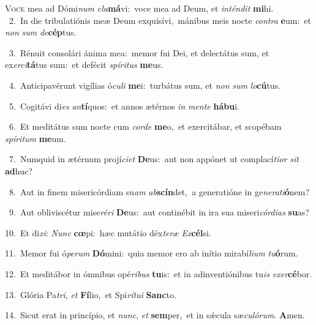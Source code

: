 \lettrine{\initial\textcolor{\initialcolor}{V}}{oce} mea ad Dómi\textit{num} \textit{cla}\-\textbf{má}vi:~\star voce mea ad Deum, et \textit{in}\-\textit{tén}\textit{dit} \textbf{mi}\-hi.\\
{\numbfont\textcolor{\numbcolor}{~2.}}~In die tribulatiónis meæ Deum exquisívi,~\dagger mánibus meis nocte \textit{con}\-\textit{tra} \textbf{e}\-um:~\star et \textit{non} \textit{sum} \textit{de}\-\textbf{cép}tus.\par
{\numbfont\textcolor{\numbcolor}{~3.}}~Rénuit consolári ánima mea:~\dagger memor fui Dei, et delectátus sum, et ex\-\textit{er}\-\textit{ci}\textbf{tá}tus sum:~\star et defécit \textit{spí}\-\textit{ri}\textit{tus} \textbf{me}\-us.\par
{\numbfont\textcolor{\numbcolor}{~4.}}~Anticipavérunt vigílias ó\-\textit{cu}\-\textit{li} \textbf{me}\-i:~\star turbátus sum, et \textit{non} \textit{sum} \textit{lo}\-\textbf{cú}tus.\par
{\numbfont\textcolor{\numbcolor}{~5.}}~Cogitávi di\textit{es} \textit{an}\-\textbf{tí}quos:~\star et annos ætérnos \textit{in} \textit{men}\-\textit{te} \textbf{há}\-\textbf{bu}i.\par
{\numbfont\textcolor{\numbcolor}{~6.}}~Et meditátus sum nocte cum \textit{cor}\-\textit{de} \textbf{me}\-o,~\star et exercitábar, et scopébam \textit{spí}\-\textit{ri}\textit{tum} \textbf{me}\-um.\par
{\numbfont\textcolor{\numbcolor}{~7.}}~Numquid in ætérnum projí\-\textit{ci}\-\textit{et} \textbf{De}\-us:~\star aut non appónet ut complací\-\textit{ti}\-\textit{or} \textit{sit} \textbf{ad}\-huc?\par
{\numbfont\textcolor{\numbcolor}{~8.}}~Aut in finem misericórdiam su\textit{am} \textit{ab}\-\textbf{scín}det,~\star a generatióne in ge\-\textit{ne}\-\textit{ra}\textit{ti}\textbf{ó}nem?\par
{\numbfont\textcolor{\numbcolor}{~9.}}~Aut obliviscétur mise\-\textit{ré}\-\textit{ri} \textbf{De}\-us:~\star aut continébit in ira sua miseri\-\textit{cór}\-\textit{di}\textit{as} \textbf{su}\-as?\par
{\numbfont\textcolor{\numbcolor}{10.}}~Et di\-\textit{xi}\-: \textit{Nunc} \textbf{cœ}\-pi:~\star hæc mutátio déx\-\textit{te}\-\textit{ræ} \textit{Ex}\-\textbf{cél}si.\par
{\numbfont\textcolor{\numbcolor}{11.}}~Memor fui ó\-\textit{pe}\-\textit{rum} \textbf{Dó}\-mini:~\star quia memor ero ab inítio mirabí\-\textit{li}\-\textit{um} \textit{tu}\-\textbf{ó}rum.\par
{\numbfont\textcolor{\numbcolor}{12.}}~Et meditábor in ómnibus opé\-\textit{ri}\-\textit{bus} \textbf{tu}\-is:~\star et in adinventiónibus tu\textit{is} \textit{ex}\-\textit{er}\textbf{cé}bor.\par
{\numbfont\textcolor{\numbcolor}{13.}}~Glória Pa\-\textit{tri}\-, \textit{et} \textbf{Fí}\-lio,~\star et Spi\-\textit{rí}\-\textit{tu}\textit{i} \textbf{Sanc}\-to.\par
{\numbfont\textcolor{\numbcolor}{14.}}~Sicut erat in princípio, et \textit{nunc}\-, \textit{et} \textbf{sem}\-per,~\star et in sǽcula sæ\-\textit{cu}\-\textit{ló}\textit{rum}. \textbf{A}\-men.\par

